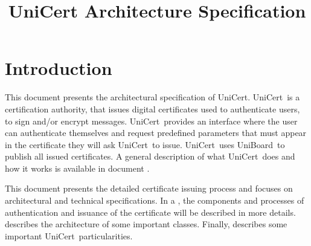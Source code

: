 \documentclass[oneside]{scrreprt}
\newcommand{\uniboard}{\mbox{UniBoard}}
\newcommand{\unicert}{\mbox{UniCert}}
\begin{document}
\lstset{
  language=Java,
  basicstyle=\footnotesize\sffamily, %
  keywordstyle=\bfseries,
  numbers=right
}

\title{UniCert Architecture Specification}
\maketitle

\begin{versionhistory}
\end{versionhistory}




\tableofcontents

\chapter{Introduction}

This document presents the architectural specification of \unicert. \unicert\ is a certification authority, that issues digital certificates used to authenticate users, to sign and/or encrypt messages. \unicert\ provides an interface where the user can authenticate themselves and request predefined parameters that must appear in the certificate they will ask \unicert\ to issue. \unicert\ uses \uniboard\ to publish all issued certificates. A general description of what \unicert\ does and how it works is available in document \cite{univote_spec}. 

This document presents the detailed certificate issuing process and focuses on architectural and technical specifications. In a , the components and processes of authentication and issuance of the certificate will be described in more details.  describes the architecture of some important classes. Finally,  describes some important \unicert\ particularities.
\end{document}
